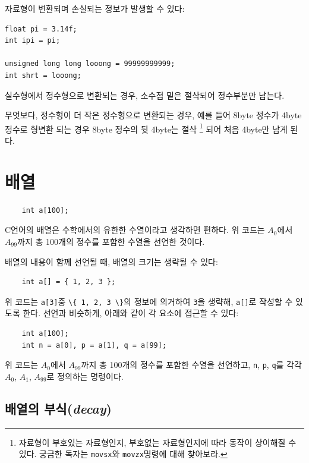 \documentclass[a4paper,12pt]{book}
\newcommand{\V}[1]{\Verb|#1|}
\begin{document}
        자료형이 변환되며 손실되는 정보가 발생할 수 있다:
        
        \begin{lstlisting}
float pi = 3.14f;
int ipi = pi;

unsigned long long looong = 99999999999;
int shrt = looong;
        \end{lstlisting}

        실수형에서 정수형으로 변환되는 경우, 소수점 밑은 절삭되어 정수부분만 남는다.

        무엇보다, 정수형이 더 작은 정수형으로 변환되는 경우, 예를 들어 8byte 정수가
        4byte 정수로 형변환 되는 경우 8byte 정수의 뒷 4byte는 절삭
        \footnote{
            자료형이 부호있는 자료형인지, 부호없는 자료형인지에 따라 동작이 상이해질 수 있다.
            궁금한 독자는 \V{movsx}와 \V{movzx}명령에 대해 찾아보라.
        }
        되어 처음 4byte만 남게 된다.

\section{배열}

    \begin{lstlisting}
    int a[100];
    \end{lstlisting}

    C언어의 배열은 수학에서의 유한한 수열이라고 생각하면 편하다.
    위 코드는 $A_0$에서 $A_{99}$까지 총 100개의 정수를 포함한 수열을 선언한 것이다.

    배열의 내용이 함께 선언될 때, 배열의 크기는 생략될 수 있다:

    \begin{lstlisting}
    int a[] = { 1, 2, 3 };
    \end{lstlisting}

    위 코드는 \V{a[3]}중 \V{\{ 1, 2, 3 \}}의 정보에 의거하여 \V{3}을 생략해, \V{a[]}로 작성할 수 있도록 한다.
    선언과 비슷하게, 아래와 같이 각 요소에 접근할 수 있다:

    \begin{lstlisting}
    int a[100];
    int n = a[0], p = a[1], q = a[99];
    \end{lstlisting}

    위 코드는 $A_0$에서 $A_{99}$까지 총 100개의 정수를 포함한 수열을 선언하고,
    \V{n}, \V{p}, \V{q}를 각각 $A_0$, $A_1$, $A_{99}$로 정의하는 명령이다.

    \subsection{배열의 부식(\textit{decay})}
\end{document}
